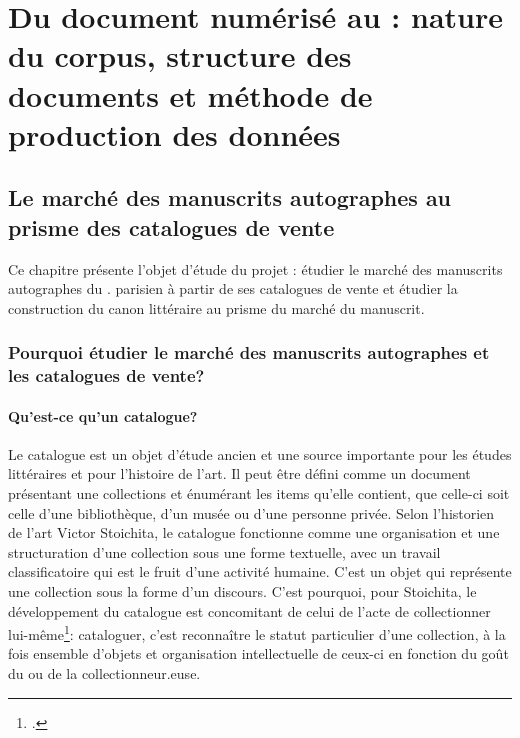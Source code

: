 
\part{Du document numérisé au \xmltei: nature du corpus, structure des documents et méthode de production des données}
\chapter{Le marché des manuscrits autographes au prisme des catalogues de vente}
Ce chapitre présente l'objet d'étude du projet \mss{} : étudier le marché des manuscrits autographes du . parisien à partir de ses catalogues de vente et étudier la construction du canon littéraire au prisme du marché du manuscrit.

\section{Pourquoi étudier le marché des manuscrits autographes et les catalogues de vente?}
\subsection{Qu'est-ce qu'un catalogue?}
Le catalogue est un objet d'étude ancien et une source importante pour les études littéraires et pour l'histoire de l'art. Il peut être défini comme un document présentant une collections et énumérant les items qu'elle contient, que celle-ci soit celle d'une bibliothèque, d'un musée ou d'une personne privée. Selon l'historien de l'art Victor Stoichita, le catalogue fonctionne comme une organisation et une structuration d'une collection sous une forme textuelle, avec un travail classificatoire qui est le fruit d'une activité humaine. C'est un objet qui représente une collection sous la forme d'un discours. C'est pourquoi, pour Stoichita, le développement du catalogue est concomitant de celui de l'acte de collectionner lui-même\footcite[p. 119-124]{stoichita_instauration_1993}: cataloguer, c'est reconnaître le statut particulier d'une collection, à la fois ensemble d'objets et organisation intellectuelle de ceux-ci en fonction du goût du ou de la collectionneur.euse.

